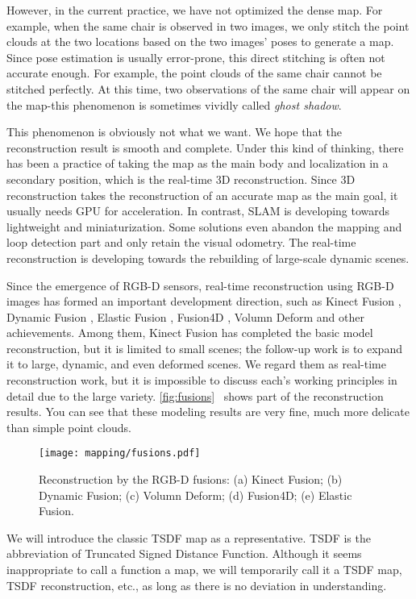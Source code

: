 However, in the current practice, we have not optimized the dense map. For example, when the same chair is observed in two images, we only stitch the point clouds at the two locations based on the two images' poses to generate a map. Since pose estimation is usually error-prone, this direct stitching is often not accurate enough. For example, the point clouds of the same chair cannot be stitched perfectly. At this time, two observations of the same chair will appear on the map-this phenomenon is sometimes vividly called \textit{ghost shadow}.

This phenomenon is obviously not what we want. We hope that the reconstruction result is smooth and complete. Under this kind of thinking, there has been a practice of taking the map as the main body and localization in a secondary position, which is the real-time 3D reconstruction. Since 3D reconstruction takes the reconstruction of an accurate map as the main goal, it usually needs GPU for acceleration. In contrast, SLAM is developing towards lightweight and miniaturization. Some solutions even abandon the mapping and loop detection part and only retain the visual odometry. The real-time reconstruction is developing towards the rebuilding of large-scale dynamic scenes.

Since the emergence of RGB-D sensors, real-time reconstruction using RGB-D images has formed an important development direction, such as Kinect Fusion {\cite{Newcombe2011}}, Dynamic Fusion {\cite{Newcombe2015}} , Elastic Fusion {\cite{Whelan2015}}, Fusion4D {\cite{Dou2016}}, Volumn Deform {\cite{Innmann2016}} and other achievements. Among them, Kinect Fusion has completed the basic model reconstruction, but it is limited to small scenes; the follow-up work is to expand it to large, dynamic, and even deformed scenes. We regard them as real-time reconstruction work, but it is impossible to discuss each's working principles in detail due to the large variety. \autoref{fig:fusions}~ shows part of the reconstruction results. You can see that these modeling results are very fine, much more delicate than simple point clouds.

\begin{figure}[!htp]
	\centering
	\texttt{[image: mapping/fusions.pdf]}
	\caption{Reconstruction by the RGB-D fusions: (a) Kinect Fusion; (b) Dynamic Fusion; (c) Volumn Deform; (d) Fusion4D; (e) Elastic Fusion.}
	\label{fig:fusions}
\end{figure}


We will introduce the classic TSDF map as a representative. TSDF is the abbreviation of Truncated Signed Distance Function. Although it seems inappropriate to call a function a map, we will temporarily call it a TSDF map, TSDF reconstruction, etc., as long as there is no deviation in understanding.

